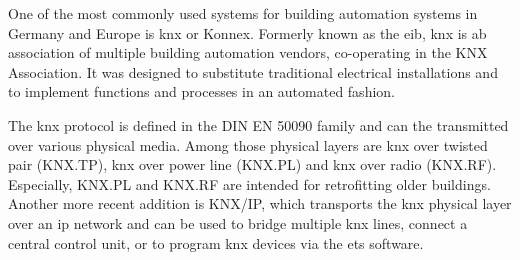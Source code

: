 One of the most commonly used systems for building automation systems in Germany and Europe is \Gls{knx} or Konnex. Formerly known as the \gls{eib}, \gls{knx} is ab association of multiple building automation vendors, co-operating in the KNX Association. %
It was designed to substitute traditional electrical installations and to implement functions and processes in an automated fashion. \parencite{Merz2009}

\newpage
The \gls{knx} protocol is defined in the DIN EN 50090 family and can the transmitted over various physical media. Among those physical layers are \gls{knx} over twisted pair (KNX.TP), \gls{knx} over power line (KNX.PL) and \gls{knx} over radio (KNX.RF). Especially, KNX.PL and KNX.RF are intended for retrofitting older buildings.
Another more recent addition is KNX/IP, which transports the \gls{knx} physical layer over an \gls{ip} network and can be used to bridge multiple \gls{knx} lines, connect a central control unit, or to program \gls{knx} devices via the \gls{ets} software.
\parencite{Merz2009}

